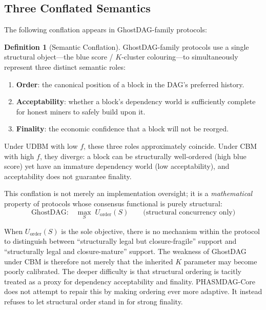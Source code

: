 \documentclass[11pt]{article}
\theoremstyle{definition}
\newtheorem{definition}{Definition}[section]
\theoremstyle{plain}
\theoremstyle{remark}
\newcommand{\Uord}{U_{\mathrm{order}}}   %
\begin{document}
\subsection{Three Conflated Semantics}

The following conflation appears in GhostDAG-family protocols:

\begin{definition}[Semantic Conflation]\label{def:conflation}
GhostDAG-family protocols use a single structural object---the blue score /
$K$-cluster colouring---to simultaneously represent three distinct semantic
roles:
\begin{enumerate}[nosep]
    \item \textbf{Order}: the canonical position of a block in the DAG's
    preferred history.
    \item \textbf{Acceptability}: whether a block's dependency world is
    sufficiently complete for honest miners to safely build upon it.
    \item \textbf{Finality}: the economic confidence that a block will not be
    reorged.
\end{enumerate}
Under UDBM with low $f$, these three roles approximately coincide.
Under CBM with high $f$, they diverge: a block can be structurally well-ordered
(high blue score) yet have an immature dependency world (low acceptability), and
acceptability does not guarantee finality.
\end{definition}

This conflation is not merely an implementation oversight; it is a
\emph{mathematical} property of protocols whose consensus functional is purely
structural:
\begin{equation}\label{eq:ghostdag_objective}
\text{GhostDAG:} \quad \max_{S}\; \Uord(S)
\qquad\text{(structural concurrency only)}
\end{equation}

When $\Uord(S)$ is the sole objective, there is no mechanism within the
protocol to distinguish between ``structurally legal but closure-fragile''
support and ``structurally legal and closure-mature'' support.
The weakness of GhostDAG under CBM is therefore not merely that the inherited
$K$ parameter may become poorly calibrated.
The deeper difficulty is that structural ordering is tacitly treated as a
proxy for dependency acceptability and finality.
PHASMDAG-Core does not attempt to repair this by making ordering ever more
adaptive.
It instead refuses to let structural order stand in for strong finality.
\end{document}
